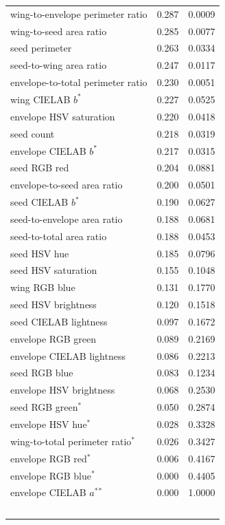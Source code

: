\begin{longtable}{@{}>{\raggedright\arraybackslash}p{} c c@{}}
        wing-to-envelope perimeter ratio & 0.287 & 0.0009 \\
        wing-to-seed area ratio & 0.285 & 0.0077 \\
        seed perimeter & 0.263 & 0.0334 \\
        seed-to-wing area ratio & 0.247 & 0.0117 \\
        envelope-to-total perimeter ratio & 0.230 & 0.0051 \\
        wing CIELAB $b^*$ & 0.227 & 0.0525 \\
        envelope HSV saturation & 0.220 & 0.0418 \\
        seed count & 0.218 & 0.0319 \\
        envelope CIELAB $b^*$ & 0.217 & 0.0315 \\
        seed RGB red & 0.204 & 0.0881 \\
        envelope-to-seed area ratio & 0.200 & 0.0501 \\
        seed CIELAB $b^*$ & 0.190 & 0.0627 \\
        seed-to-envelope area ratio & 0.188 & 0.0681 \\
        seed-to-total area ratio & 0.188 & 0.0453 \\
        seed HSV hue & 0.185 & 0.0796 \\
        seed HSV saturation & 0.155 & 0.1048 \\
        wing RGB blue & 0.131 & 0.1770 \\
        seed HSV brightness & 0.120 & 0.1518 \\
        seed CIELAB lightness & 0.097 & 0.1672 \\
        envelope RGB green & 0.089 & 0.2169 \\
        envelope CIELAB lightness & 0.086 & 0.2213 \\
        seed RGB blue & 0.083 & 0.1234 \\
        envelope HSV brightness & 0.068 & 0.2530 \\
        seed RGB green$^{\ast}$ & 0.050 & 0.2874 \\
        envelope HSV hue$^{\ast}$ & 0.028 & 0.3328 \\
        wing-to-total perimeter ratio$^{\ast}$ & 0.026 & 0.3427 \\
        envelope RGB red$^{\ast}$ & 0.006 & 0.4167 \\
        envelope RGB blue$^{\ast}$ & 0.000 & 0.4405 \\
        envelope CIELAB $a^*$$^{\ast}$ & 0.000 & 1.0000 \\
$$
\end{longtable}
